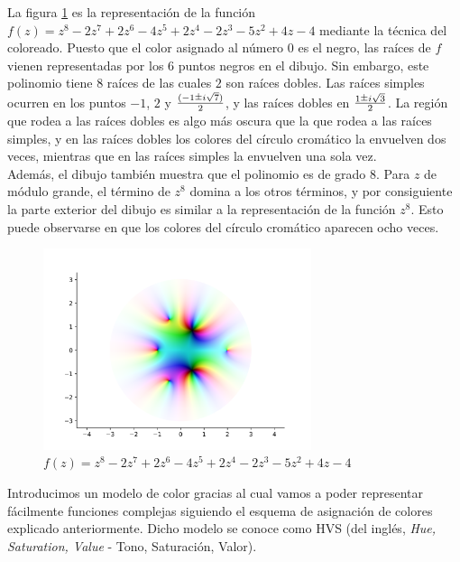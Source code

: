 La figura \ref{fig:z^8-2z^7+2z^6-4z^5+2z^4-2z^3-5z^2+4z-4} es la representación de la función $f(z) = z^8-2z^7+2z^6-4z^5+2z^4-2z^3-5z^2+4z-4$ mediante la técnica del coloreado. Puesto que el color asignado al número $0$ es el negro, las raíces de $f$ vienen representadas por los $6$ puntos negros en el dibujo. Sin embargo, este polinomio tiene $8$ raíces de las cuales $2$ son raíces dobles. Las raíces simples ocurren en los puntos $-1$, $2$ y $\frac{(-1 \rpm i \sqrt{7})}{2}$, y las raíces dobles en $\frac{1 \rpm i \sqrt{3}}{2}$.  La región que rodea a las raíces dobles es algo más oscura que la que rodea a las raíces simples, y en las raíces dobles los colores del círculo cromático la envuelven dos veces, mientras que en las raíces simples la envuelven una sola vez. \\

Además, el dibujo también muestra que el polinomio es de grado $8$. Para $z$ de módulo grande, el término de $z^8$ domina a los otros términos, y por consiguiente la parte exterior del dibujo es similar a la representación de la función $z^8$. Esto puede observarse en que los colores del círculo cromático aparecen ocho veces. \\

\begin{figure}[h]
    \centering
    \includegraphics[width=0.7\textwidth]{../Aplicacion/z^8-2z^7+2z^6-4z^5+2z^4-2z^3-5z^2+4z-4.png}
    \caption{$f(z) = z^8-2z^7+2z^6-4z^5+2z^4-2z^3-5z^2+4z-4$}
    \label{fig:z^8-2z^7+2z^6-4z^5+2z^4-2z^3-5z^2+4z-4}
\end{figure}


Introducimos un modelo de color gracias al cual vamos a poder representar fácilmente funciones complejas siguiendo el esquema de asignación de colores explicado anteriormente. Dicho modelo se conoce como HVS (del inglés, \textit{Hue, Saturation, Value} - Tono, Saturación, Valor). \\

